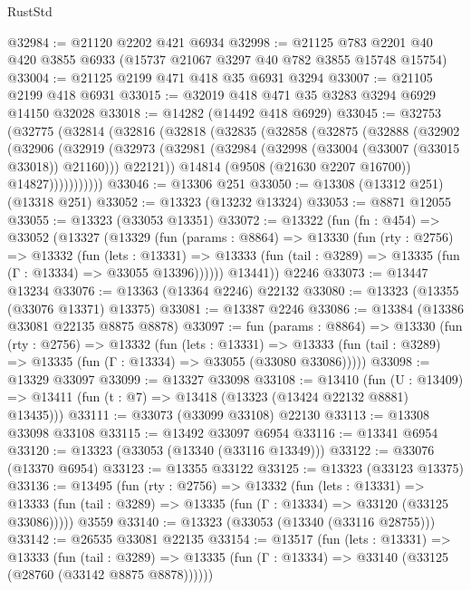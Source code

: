 \begin{lexlean}{RustStd}
\begin{coremodule}
@32984 := @21120 @2202 @421 @6934
@32998 := @21125 @783 @2201 @40 @420 @3855 @6933 (@15737 @21067 @3297 @40 @782 @3855 @15748 @15754)
@33004 := @21125 @2199 @471 @418 @35 @6931 @3294
@33007 := @21105 @2199 @418 @6931
@33015 := @32019 @418 @471 @35 @3283 @3294 @6929 @14150 @32028
@33018 := @14282 (@14492 @418 @6929)
@33045 := @32753
    (@32775
      (@32814
        (@32816
          (@32818
            (@32835
              (@32858
                (@32875
                  (@32888
                    (@32902
                      (@32906
                        (@32919
                          (@32973
                            (@32981
                              (@32984 (@32998 (@33004 (@33007 (@33015 @33018)) @21160)))
                              @22121))
                          @14814
                          (@9508 (@21630 @2207 @16700))
                          @14827)))))))))))
@33046 := @13306 @251
@33050 := @13308 (@13312 @251) (@13318 @251)
@33052 := @13323 (@13232 @13324)
@33053 := @8871 @12055
@33055 := @13323 (@33053 @13351)
@33072 := @13322
    (fun (fn : @454) =>
    @33052
      (@13327
        (@13329
          (fun (params : @8864) =>
          @13330
            (fun (rty : @2756) =>
            @13332
              (fun (lets : @13331) =>
              @13333 (fun (tail : @3289) => @13335 (fun (Γ : @13334) => @33055 @13396))))))
        @13441))
    @2246
@33073 := @13447 @13234
@33076 := @13363 (@13364 @2246) @22132
@33080 := @13323 (@13355 (@33076 @13371) @13375)
@33081 := @13387 @2246
@33086 := @13384 (@13386 @33081 @22135 @8875 @8878)
@33097 := fun (params : @8864) =>
  @13330
    (fun (rty : @2756) =>
    @13332
      (fun (lets : @13331) =>
      @13333 (fun (tail : @3289) => @13335 (fun (Γ : @13334) => @33055 (@33080 @33086)))))
@33098 := @13329 @33097
@33099 := @13327 @33098
@33108 := @13410
    (fun (U : @13409) => @13411 (fun (t : @7) => @13418 (@13323 (@13424 @22132 @8881) @13435)))
@33111 := @33073 (@33099 @33108) @22130
@33113 := @13308 @33098 @33108
@33115 := @13492 @33097 @6954
@33116 := @13341 @6954
@33120 := @13323 (@33053 (@13340 (@33116 @13349)))
@33122 := @33076 (@13370 @6954)
@33123 := @13355 @33122
@33125 := @13323 (@33123 @13375)
@33136 := @13495
    (fun (rty : @2756) =>
    @13332
      (fun (lets : @13331) =>
      @13333 (fun (tail : @3289) => @13335 (fun (Γ : @13334) => @33120 (@33125 @33086)))))
    @3559
@33140 := @13323 (@33053 (@13340 (@33116 @28755)))
@33142 := @26535 @33081 @22135
@33154 := @13517
    (fun (lets : @13331) =>
    @13333
      (fun (tail : @3289) =>
      @13335 (fun (Γ : @13334) => @33140 (@33125 (@28760 (@33142 @8875 @8878))))))

\end{coremodule}
\end{lexlean}
